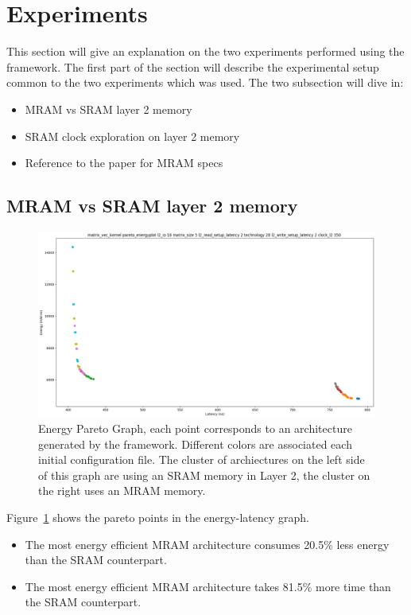 \section{Experiments}
This section will give an explanation on the two experiments performed using the framework.
The first part of the section will describe the experimental setup common to the two experiments which was used.
The two subsection will dive in:
\begin{itemize}
	\item MRAM vs SRAM layer 2 memory
	\item SRAM clock exploration on layer 2 memory
	\item Reference to the paper for MRAM specs~\cite{8310393}
\end{itemize}

\subsection{MRAM vs SRAM layer 2 memory}

\begin{figure}[tb] 
\centering
\includegraphics[width=\columnwidth]{images/sram_mram_matrix_vec_energy_pareto_2.png}
\caption{\small Energy Pareto Graph, each point corresponds to an architecture generated by the framework. Different colors are associated each initial configuration file. The cluster of archiectures on the left side of this graph are using an SRAM memory in Layer 2, the cluster on the right uses an MRAM memory. }
\label{fig:sram_mram_energy_graph}
\end{figure}

Figure~\ref{fig:sram_mram_energy_graph} shows the pareto points in the energy-latency graph.
\begin{itemize}
\item The most energy efficient MRAM architecture consumes 20.5\% less energy than the SRAM counterpart.
\item The most energy efficient MRAM architecture takes 81.5\% more time than the SRAM counterpart.
\end{itemize}

